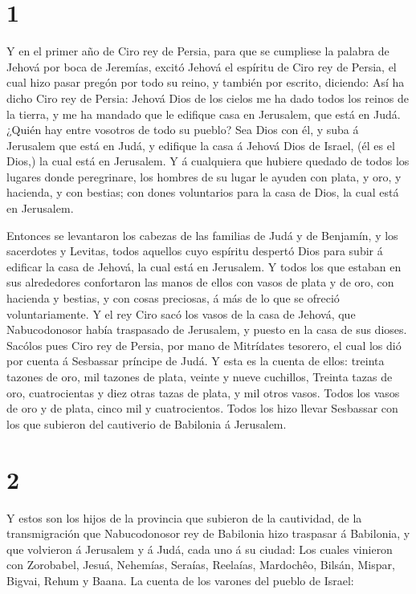 \hypertarget{section}{%
\section{1}\label{section}}

 Y en el primer año de Ciro rey de Persia, para que se
cumpliese la palabra de Jehová por boca de Jeremías, excitó Jehová el
espíritu de Ciro rey de Persia, el cual hizo pasar pregón por todo su
reino, y también por escrito, diciendo:  Así ha dicho Ciro
rey de Persia: Jehová Dios de los cielos me ha dado todos los reinos de
la tierra, y me ha mandado que le edifique casa en Jerusalem, que está
en Judá.  ¿Quién hay entre vosotros de todo su pueblo? Sea
Dios con él, y suba á Jerusalem que está en Judá, y edifique la casa á
Jehová Dios de Israel, (él es el Dios,) la cual está en Jerusalem.
 Y á cualquiera que hubiere quedado de todos los lugares
donde peregrinare, los hombres de su lugar le ayuden con plata, y oro, y
hacienda, y con bestias; con dones voluntarios para la casa de Dios, la
cual está en Jerusalem.

 Entonces se levantaron los cabezas de las familias de Judá
y de Benjamín, y los sacerdotes y Levitas, todos aquellos cuyo espíritu
despertó Dios para subir á edificar la casa de Jehová, la cual está en
Jerusalem.  Y todos los que estaban en sus alrededores
confortaron las manos de ellos con vasos de plata y de oro, con hacienda
y bestias, y con cosas preciosas, á más de lo que se ofreció
voluntariamente.  Y el rey Ciro sacó los vasos de la casa de
Jehová, que Nabucodonosor había traspasado de Jerusalem, y puesto en la
casa de sus dioses.  Sacólos pues Ciro rey de Persia, por
mano de Mitrídates tesorero, el cual los dió por cuenta á Sesbassar
príncipe de Judá.  Y esta es la cuenta de ellos: treinta
tazones de oro, mil tazones de plata, veinte y nueve cuchillos,
 Treinta tazas de oro, cuatrocientas y diez otras tazas de
plata, y mil otros vasos.  Todos los vasos de oro y de
plata, cinco mil y cuatrocientos. Todos los hizo llevar Sesbassar con
los que subieron del cautiverio de Babilonia á Jerusalem.

\hypertarget{section-1}{%
\section{2}\label{section-1}}

 Y estos son los hijos de la provincia que subieron de la
cautividad, de la transmigración que Nabucodonosor rey de Babilonia hizo
traspasar á Babilonia, y que volvieron á Jerusalem y á Judá, cada uno á
su ciudad:  Los cuales vinieron con Zorobabel, Jesuá,
Nehemías, Seraías, Reelaías, Mardochêo, Bilsán, Mispar, Bigvai, Rehum y
Baana. La cuenta de los varones del pueblo de Israel:

